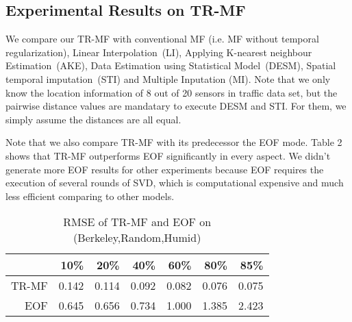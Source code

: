 \subsection{Experimental Results on TR-MF} \label{subsec:exp_basic}%
We compare our TR-MF with conventional MF (i.e. MF without temporal regularization), Linear Interpolation~(LI), Applying K-nearest neighbour Estimation~(AKE), Data Estimation using Statistical Model~(DESM), Spatial temporal imputation~(STI) and Multiple Inputation (MI).
Note that we only know the location information of 8 out of 20 sensors in traffic data set, but the pairwise distance values are mandatary to execute DESM and STI. For them, we simply assume the distances are all equal.

Note that we also compare TR-MF with its predecessor the EOF mode. Table 2 shows that TR-MF outperforms EOF significantly in every aspect. We didn't generate more EOF results for other experiments because EOF requires the execution of several rounds of SVD, which is computational expensive and much less efficient comparing to other models. 

\begin{table}[htbp]
\setlength{\tabcolsep}{2pt}
\centering
\caption{RMSE of TR-MF and EOF on (Berkeley,Random,Humid)}
\label{table:trmf_eof}
\begin{tabular}{ r | r r r r r r}
		&10\%	&20\%	&40\%	&60\%	&80\% &85\% \\ 
	 \hline
	 TR-MF & 0.142 &0.114 &0.092&0.082&0.076 & 0.075 \\
     EOF	 &0.645 &0.656 &0.734 &1.000 &1.385 &2.423\\
\end{tabular}
\end{table}


